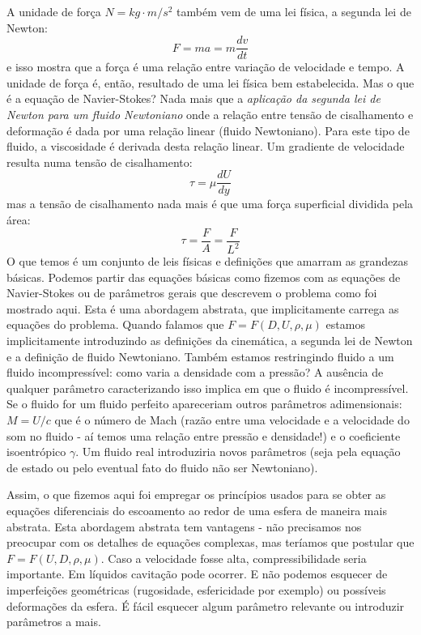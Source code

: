 A unidade de força $N = kg\cdot m/s^2$ também vem de uma lei física, a segunda lei de Newton:
\[
F = ma = m\frac{dv}{dt}
\]
e isso mostra que a força é uma relação entre variação de velocidade e tempo. A unidade de força é, então, resultado de uma lei física bem estabelecida. Mas o que é a equação de Navier-Stokes? Nada mais que a \emph{aplicação da segunda lei de Newton para um fluido  Newtoniano} onde a relação entre tensão de cisalhamento e deformação é dada por uma relação linear (fluido Newtoniano). Para este tipo de fluido, a viscosidade é derivada desta relação linear. Um gradiente de velocidade resulta numa tensão de cisalhamento:
\[
\tau = \mu \frac{dU}{dy}
\]
mas a tensão de cisalhamento nada mais é que uma força superficial dividida pela área:
\[
\tau = \frac{F}{A} = \frac{F}{L^2}
\]
O que temos é um conjunto de leis físicas e definições que amarram as grandezas básicas. Podemos partir das equações básicas como fizemos com as equações de Navier-Stokes ou de parâmetros gerais que descrevem o problema como foi mostrado aqui. Esta é uma abordagem abstrata, que implicitamente carrega as equações do problema. Quando falamos que $F = F(D, U, \rho, \mu)$ estamos implicitamente introduzindo as definições da cinemática, a segunda lei de Newton e a definição de fluido Newtoniano. Também estamos restringindo fluido a um fluido incompressível: como varia a densidade com a pressão? A ausência de qualquer parâmetro caracterizando isso implica em que o fluido é incompressível. Se o fluido for um fluido perfeito apareceriam outros parâmetros adimensionais: $M = U/c$ que é o número de Mach (razão entre uma velocidade e a velocidade do som no fluido - aí temos uma relação entre pressão e densidade!) e o coeficiente isoentrópico $\gamma$. Um fluido real introduziria novos parâmetros (seja pela equação de estado ou pelo eventual fato do fluido não ser Newtoniano). 

Assim, o que fizemos aqui foi empregar os princípios usados para se obter as equações diferenciais do escoamento ao redor de uma esfera de maneira mais abstrata. Esta abordagem abstrata tem vantagens - não precisamos nos preocupar com os detalhes de equações complexas,  mas teríamos que postular que $F = F(U, D, \rho, \mu)$. Caso a velocidade fosse alta, compressibilidade seria importante. Em líquidos cavitação pode ocorrer. E não podemos esquecer de imperfeições geométricas (rugosidade, esfericidade por exemplo) ou possíveis deformações da esfera. É fácil esquecer algum parâmetro relevante ou introduzir parâmetros a mais. 

